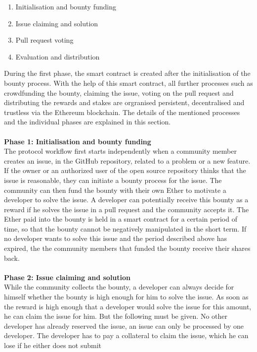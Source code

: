 \documentclass[sigconf]{acmart}
\begin{document}
\begin{enumerate}
  \item Initialisation and bounty funding
  \item Issue claiming and solution
  \item Pull request voting
  \item Evaluation and distribution \\
\end{enumerate}
During the first phase, the smart contract is created after the initialisation of the bounty process. With the help of this smart contract, 
all further processes such as crowdfunding the bounty, claiming the issue, voting on the pull request and distributing the rewards and 
stakes are orgranised persistent, decentralised and trustless via the Ethereum blockchain. The details of the mentioned processes and 
the individual phases are explained in this section. \\ \\
\textbf{Phase 1: Initialisation and bounty funding} \\
The protocol workflow first starts independently when a community member creates an issue, in the GitHub repository, 
related to a problem or a new feature. If the owner or an authorized user of the open source repository thinks that the issue 
is reasonable, they can initiate a bounty process for the issue. The community can then fund the bounty with their own Ether
 to motivate a developer to solve the issue. A developer can potentially receive this bounty as a reward  if he solves the 
issue in a pull request and the community accepts it. The Ether paid into the bounty is held in a smart contract for a certain 
period of time, so that the bounty cannot be negatively manipulated in the short term. If no developer wants to solve this issue
and the period described above has expired, the the community members that funded the bounty receive their shares back. \\ \\
\textbf{Phase 2: Issue claiming and solution} \\
While the community collects the bounty, a developer can always decide for himself whether the bounty is high enough for him to 
solve the issue. As soon as the reward is high enough that a developer would solve the issue for this amount, he can claim the
issue for him. But the following must be given. No other developer has already reserved the issue, an issue can only be processed 
by one developer. The developer has to pay a collateral to claim the issue, which he can lose if he either does not submit 
\end{document}
